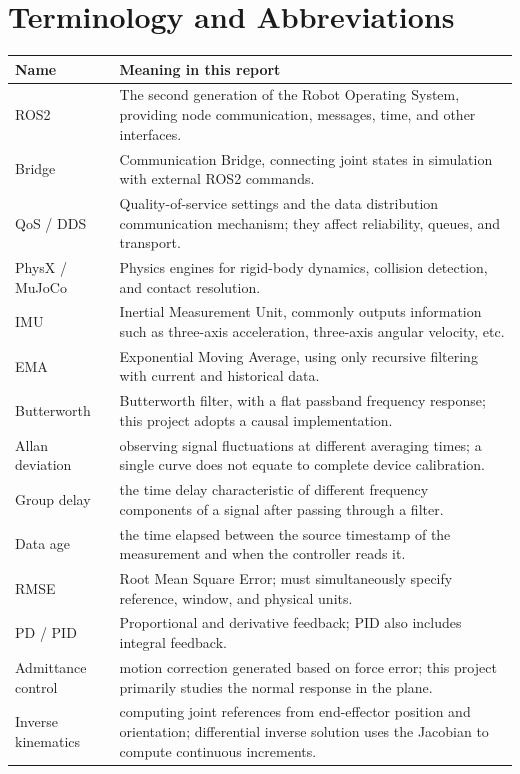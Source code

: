 \chapter{Terminology and Abbreviations}
\begin{longtable}{p{.20\linewidth}p{.70\linewidth}}
\toprule Name & Meaning in this report \\\midrule\endhead
ROS2 & The second generation of the Robot Operating System, providing node communication, messages, time, and other interfaces.\\
Bridge & Communication Bridge, connecting joint states in simulation with external ROS2 commands.\\
QoS / DDS & Quality-of-service settings and the data distribution communication mechanism; they affect reliability, queues, and transport.\\
PhysX / MuJoCo & Physics engines for rigid-body dynamics, collision detection, and contact resolution.\\
IMU & Inertial Measurement Unit, commonly outputs information such as three-axis acceleration, three-axis angular velocity, etc.\\
EMA & Exponential Moving Average, using only recursive filtering with current and historical data.\\
Butterworth & Butterworth filter, with a flat passband frequency response; this project adopts a causal implementation.\\
Allan deviation & observing signal fluctuations at different averaging times; a single curve does not equate to complete device calibration.\\
Group delay & the time delay characteristic of different frequency components of a signal after passing through a filter.\\
Data age & the time elapsed between the source timestamp of the measurement and when the controller reads it.\\
RMSE & Root Mean Square Error; must simultaneously specify reference, window, and physical units.\\
PD / PID & Proportional and derivative feedback; PID also includes integral feedback.\\
Admittance control & motion correction generated based on force error; this project primarily studies the normal response in the plane.\\
Inverse kinematics & computing joint references from end-effector position and orientation; differential inverse solution uses the Jacobian to compute continuous increments. \\

\end{longtable}
